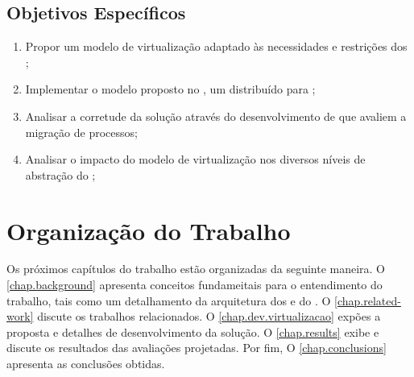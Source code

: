 \subsection{Objetivos Específicos}
\label{sec.goals.secondary}

\begin{enumerate}[label= (\roman*)]
    \item Propor um modelo de virtualização adaptado às necessidades e restrições dos \lws;
    \item Implementar o modelo proposto no \nanvix, um \so distribuído para \lws;
    \item Analisar a corretude da solução através do desenvolvimento de \benchmarks que avaliem a migração de processos;
    \item Analisar o impacto do modelo de virtualização nos diversos níveis de abstração do \nanvix;
\end{enumerate}

\section{Organização do Trabalho}
\label{sec.organization}

Os próximos capítulos do trabalho estão organizadas da seguinte maneira. O \autoref{chap.background} apresenta conceitos fundameitais para o entendimento do trabalho, tais como um detalhamento da arquitetura dos \lws e do \nanvix. O \autoref{chap.related-work} discute os trabalhos relacionados. O \autoref{chap.dev.virtualizacao} expões a proposta e detalhes de desenvolvimento da solução. O \autoref{chap.results} exibe e discute os resultados das avaliações projetadas. Por fim, O \autoref{chap.conclusions} apresenta as conclusões obtidas.
